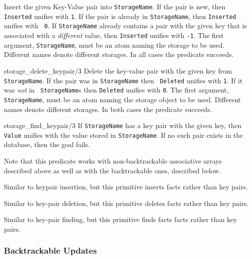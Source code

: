 \begin{description}
Insert the given Key-Value pair into {\tt StorageName}.  If the pair
is new, then {\tt Inserted} unifies with {\tt 1}. If the pair is
already in {\tt StorageName}, then {\tt Inserted} unifies with {\tt
  0}. If {\tt StorageName} already contains a pair with the given key
that is associated with a \emph{different} value, then {\tt Inserted}
unifies with {\tt -1}.  The first argument, {\tt StorageName}, must be
an atom naming the storage to be used. Different names denote
different storages.  In all cases the predicate succeeds.

{storage\_delete\_keypair/3}
Delete the key-value pair with the given key from {\tt
  StorageName}. If the pair was in {\tt StorageName} then {\tt
  Deleted} unifies with {\tt 1}.  If it was \emph{not} in {\tt
  StorageName}s then {\tt Deleted} unifies with {\tt 0}.  The first
argument, {\tt StorageName}, must be an atom naming the storage object
to be used. Different names denote different storages.  In both cases
the predicate succeeds.

{storage\_find\_keypair/3}
If {\tt StorageName} has a key pair with the given key, then {\tt Value} unifies
with the value stored in {\tt StorageName}. If no such pair exists in the
database, then the goal fails.

Note that this predicate works with non-backtrackable associative arrays
described above as well as with the backtrackable ones, described below.

Similar to keypair insertion, but this primitive inserts facts rather than
key pairs.

Similar to key-pair deletion, but this primitive deletes facts rather than
key pairs.

Similar to key-pair finding, but this primitive finds facts facts rather than
key pairs.
\end{description}

\subsubsection{Backtrackable Updates}
\label{backtrackable update}

